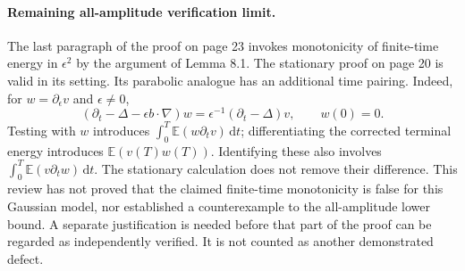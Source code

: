 \documentclass[10pt]{article}
\begin{document}
\paragraph*{Remaining all-amplitude verification limit.}\mbox{}\par
The last paragraph of the proof on page 23 invokes monotonicity of finite-time energy in \(\epsilon^2\) by the argument of Lemma 8.1. The stationary proof on page 20 is valid in its setting. Its parabolic analogue has an additional time pairing. Indeed, for \(w=\partial_\epsilon v\) and \(\epsilon\ne0\), \[(\partial_t-\Delta-\epsilon b\cdot\nabla)w
       =\epsilon^{-1}(\partial_t-\Delta)v,\qquad w(0)=0.\] Testing with \(w\) introduces \(\int_0^T\mathbb E(w\partial_t v)\,\mathrm dt\); differentiating the corrected terminal energy introduces \(\mathbb E(v(T)w(T))\). Identifying these also involves \(\int_0^T\mathbb E(v\partial_t w)\,\mathrm dt\). The stationary calculation does not remove their difference. This review has not proved that the claimed finite-time monotonicity is false for this Gaussian model, nor established a counterexample to the all-amplitude lower bound. A separate justification is needed before that part of the proof can be regarded as independently verified. It is not counted as another demonstrated defect.\par
\end{document}
